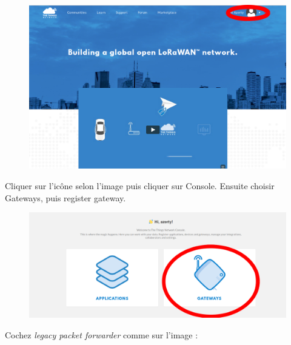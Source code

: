 \documentclass{article}
\begin{document}
\begin{figure}[H]
\begin{center}
\advance\leftskip-3cm
\advance\rightskip-3cm
\includegraphics[keepaspectratio=true,scale=0.2]{ttn_console.png}
\label{visina8}
\end{center}\end{figure}

Cliquer sur l'icône selon l'image puis cliquer sur Console.
Ensuite choisir Gateways, puis register gateway.



\begin{figure}[H]
\begin{center}
\advance\leftskip-3cm
\advance\rightskip-3cm
\includegraphics[keepaspectratio=true,scale=0.2]{ttn_registergateway.png}
\label{visina8}
\end{center}\end{figure}

Cochez \textit{legacy packet forwarder} comme sur l'image :
\end{document}
